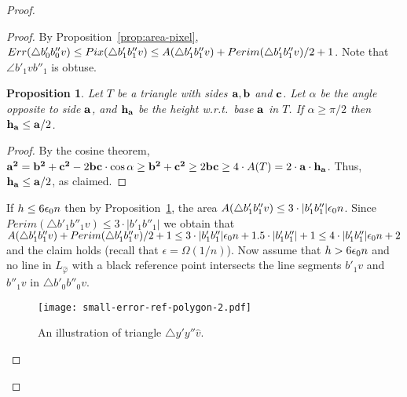 \documentclass[11pt,english]{article}
\newtheorem{proposition}[theorem]{Proposition}
\numberwithin{figure}{section}
\newcommand{\eps}{{\epsilon}}
\begin{document}
\begin{proof}
{\begin{proof}
By Proposition~\ref{prop:area-pixel}, $Err(\bigtriangleup b'_0b''_0v)\leq Pix(\bigtriangleup b'_1b''_1v)\leq A(\bigtriangleup b'_1b''_1v)+Perim(\bigtriangleup b'_1b''_1v)/2+1$. Note that $\angle b'_1vb''_1$ is obtuse.
\begin{proposition}
\label{prop:obtuse-height}
Let $T$ be a triangle with sides ${\bf a,b}$ and ${\bf c}$. Let $\alpha$ be the angle opposite to side ${\bf a}$, and ${\bf h_a}$ be the height w.r.t.\ base ${\bf a}$ in $T$. If $\alpha\geq \pi/2$ then ${\bf h_a}\leq {\bf a}/2$.
\end{proposition}
\begin{proof}
By the cosine theorem, ${\bf a^2}={\bf b^2}+{\bf c^2}-2{\bf b}{\bf c}\cdot\cos{\alpha}\geq {\bf b^2}+{\bf c^2}\geq 2{\bf b}{\bf c}\geq4\cdot A(T)=2\cdot{\bf a}\cdot {\bf h_a}$. Thus, ${\bf h_a}\leq {\bf a}/2$, as claimed.
\end{proof}
If $h\leq 6{\epsilon_0} n$ then by Proposition~\ref{prop:obtuse-height}, the area $A(\bigtriangleup b'_1b''_1v)\leq 3\cdot|b'_1b''_1|{\epsilon_0} n$. Since $Perim(\bigtriangleup b'_1b''_1v)\leq 3\cdot|b'_1b''_1|$ we obtain that $A(\bigtriangleup b'_1b''_1v)+Perim(\bigtriangleup b'_1b''_1v)/2+1\leq 3\cdot|b'_1b''_1|{\epsilon_0} n+1.5\cdot|b'_1b''_1|+1\leq 4\cdot|b'_1b''_1|{\epsilon_0} n+2$ and the claim holds (recall that $\eps=\Omega(1/n)$). Now assume that $h>6{\epsilon_0} n$ and no line in $L_{\hat\varphi}$ with a black reference point intersects the line segments $b'_1v$ and $b''_1v$ in $\bigtriangleup b'_0b''_0v$.



\begin{figure}
\centering
\texttt{[image: small-error-ref-polygon-2.pdf]}
\caption{ An illustration of triangle $\bigtriangleup y'y''\hat v$.}
\label{fig:small-error-ref-poly-2}
\end{figure}


\end{proof}}
\end{proof}
\end{document}
